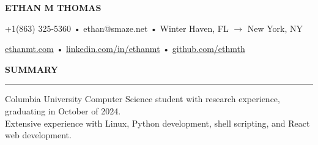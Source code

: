 \documentclass[11pt,letterpaper]{article}
\begin{document}
\begingroup
\centerline{\MakeUppercase{\LARGE\bf Ethan M Thomas}} \medskip
\endgroup

\begingroup
\centerline{+1(863) 325-5360 • ethan@smaze.net • Winter Haven, FL $\rightarrow$ New York, NY}
\endgroup
\par

\begingroup
\centerline{\href{www.ethanmt.com}{ethanmt.com} • \href{https://www.linkedin.com/in/ethanmt/}{linkedin.com/in/ethanmt} • \href{https://github.com/ethmth}{github.com/ethmth}}
\endgroup
\par


\medskip
\MakeUppercase{{\bf Summary}} %
\medskip
\hrule %
\begin{list}{}{\setlength{\leftmargin}{0em}}
    \item
          {Columbia University Computer Science student with research experience, graduating in October of 2024. \\
          Extensive experience with Linux, Python development, shell scripting, and React web development.
          }
\end{list}


\end{document}
